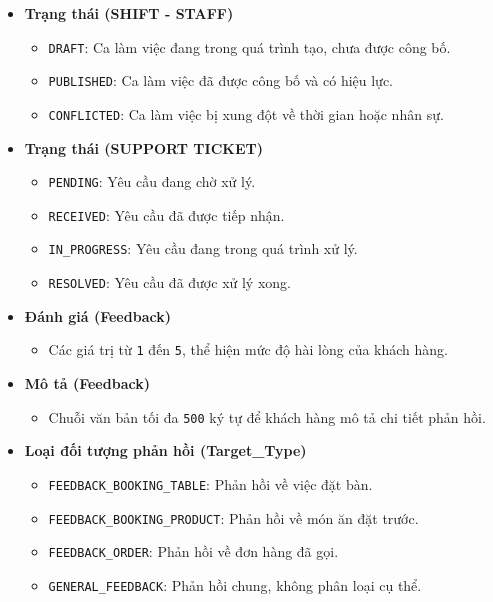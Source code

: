 \begin{itemize}
  \item \textbf{Trạng thái (SHIFT - STAFF)}
    \begin{itemize}
        \item \texttt{DRAFT}: Ca làm việc đang trong quá trình tạo, chưa được công bố.
        \item \texttt{PUBLISHED}: Ca làm việc đã được công bố và có hiệu lực.
        \item \texttt{CONFLICTED}: Ca làm việc bị xung đột về thời gian hoặc nhân sự.
    \end{itemize}

  \item \textbf{Trạng thái (SUPPORT TICKET)}
    \begin{itemize}
        \item \texttt{PENDING}: Yêu cầu đang chờ xử lý.
        \item \texttt{RECEIVED}: Yêu cầu đã được tiếp nhận.
        \item \texttt{IN\_PROGRESS}: Yêu cầu đang trong quá trình xử lý.
        \item \texttt{RESOLVED}: Yêu cầu đã được xử lý xong.
    \end{itemize}

  \item \textbf{Đánh giá (Feedback)}
    \begin{itemize}
        \item Các giá trị từ \texttt{1} đến \texttt{5}, thể hiện mức độ hài lòng của khách hàng.
    \end{itemize}

  \item \textbf{Mô tả (Feedback)}
    \begin{itemize}
        \item Chuỗi văn bản tối đa \texttt{500} ký tự để khách hàng mô tả chi tiết phản hồi.
    \end{itemize}

  \item \textbf{Loại đối tượng phản hồi (Target\_Type)}
    \begin{itemize}
        \item \texttt{FEEDBACK\_BOOKING\_TABLE}: Phản hồi về việc đặt bàn.
        \item \texttt{FEEDBACK\_BOOKING\_PRODUCT}: Phản hồi về món ăn đặt trước.
        \item \texttt{FEEDBACK\_ORDER}: Phản hồi về đơn hàng đã gọi.
        \item \texttt{GENERAL\_FEEDBACK}: Phản hồi chung, không phân loại cụ thể.
    \end{itemize}


\end{itemize}

